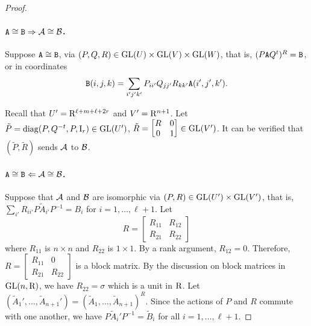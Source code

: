\begin{proof}
	\paragraph{$\mathtt{A}\cong \mathtt{B}\Rightarrow\mathcal{A}\cong \mathcal{B}$.} Suppose $\mathtt{A} \cong \mathtt{B}$, via $(P,Q,R)\in\mathrm{GL}(U)\times\mathrm{GL}(V)\times\mathrm{GL}(W)$, that is, $(P \mathtt{A} Q^t)^R = \mathtt{B}$, or in coordinates
	\[
	\mathtt{B}(i,j,k) = \sum_{i'j'k'} P_{ii'} Q_{jj'} R_{kk'} \mathtt{A}(i',j',k').
	\]
	
	Recall that $U'=\mathrm{R}^{\ell+m+\ell+2r}$ and $V'=\mathrm{R}^{n+1}$. 
	Let $\tilde P = \operatorname{diag}(P, Q^{-t}, P, \mathrm{I}_{r})\in \mathrm{GL}(U')$, $\tilde R = \begin{bmatrix} R & 0 \\ 0 & 1 \end{bmatrix}\in\mathrm{GL}(V')$.  It can be verified that $(\tilde P, \tilde R)$ sends $\mathcal{A}$ to $\mathcal{B}$. 
	
	\paragraph{$\mathtt{A}\cong \mathtt{B}\Leftarrow\mathcal{A}\cong \mathcal{B}$.} Suppose that $\mathcal{A}$ and $\mathcal{B}$ are isomorphic via $(P, R)\in\mathrm{GL}(U')\times\mathrm{GL}(V')$, that is, $\sum_{i'} R_{ii'} P \tilde A_{i'} P^{-1} = B_i$ for $i = 1,\dotsc,\ell+1$. Let 
	\[
	R = \begin{bmatrix}
		R_{11} & R_{12} \\
		R_{21} & R_{22}
	\end{bmatrix}
	\]
	where $R_{11}$ is $n \times n$ and $R_{22}$ is $1 \times 1$. By a rank argument, $R_{12} = 0$. Therefore, $R=\begin{bmatrix}
		R_{11} & 0 \\
		R_{21} & R_{22}
	\end{bmatrix}$ is a block matrix. By the discussion on block matrices in $\mathrm{GL}(n, \mathrm{R})$, we have $R_{22}=\sigma$ which is a unit in $\mathrm{R}$. %
	Let $(\tilde A_1',\dotsc, \tilde A_{n+1}') = (\tilde A_1, \dotsc, \tilde A_{n+1})^R$. Since the actions of $P$ and $R$ commute with one another, we have $P \tilde A_i' P^{-1} = \tilde B_i$ for all $i=1,\dotsc,\ell+1$. 
	

\end{proof}
